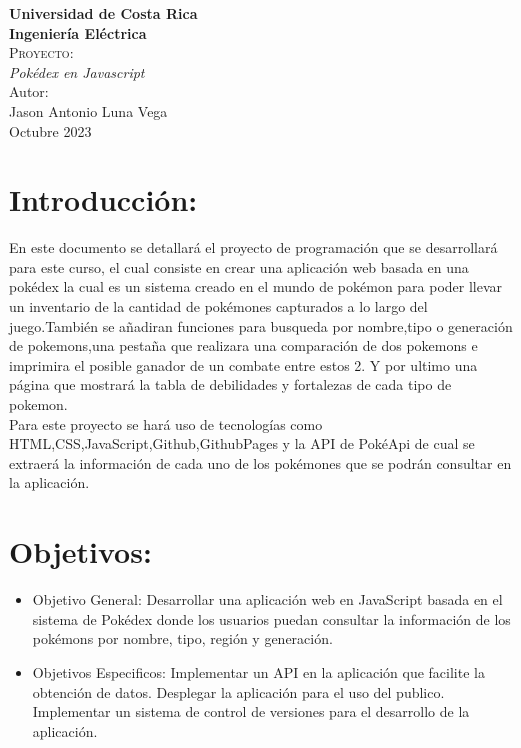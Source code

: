 \documentclass[12pt]{article}
\begin{document}
	\begin{titlepage}
		\centering
		\textbf{\LARGE Universidad de Costa Rica}\\
		\vspace{3cm}
		\textbf{\Large Ingeniería Eléctrica}\\
		\vspace{1.5cm}
		\textsc{ \Huge Proyecto:}\\
		\vspace{3cm}
		\textit{\Large Pokédex en Javascript }\\
		\vfill       
		\Large Autor: \\
		\Large Jason Antonio Luna Vega\\
		\vfill
		\Large Octubre 2023\\
	\end{titlepage}
	
	\tableofcontents\vspace{18cm}

    \section{Introducción: }
    En este documento se detallará el proyecto de programación que se desarrollará para este curso, el cual consiste en crear una aplicación web basada en una pokédex la cual es un sistema creado en el mundo de pokémon para poder llevar un inventario de la cantidad de pokémones capturados a lo largo del juego.También se añadiran funciones para busqueda por nombre,tipo o generación de pokemons,una pestaña que realizara una comparación de dos pokemons e imprimira el posible ganador de un combate entre estos 2. Y por ultimo una página que mostrará la tabla de debilidades y fortalezas de cada tipo de pokemon.\vspace{0.5cm}
    \\
    Para este proyecto se hará uso de tecnologías como HTML,CSS,JavaScript,Github,GithubPages y la API de PokéApi de cual se extraerá la información de cada uno de los pokémones que se podrán consultar en la aplicación.\vspace{0.5cm}
    \\

    \section{Objetivos: }
        \begin{itemize}
            \item Objetivo General: Desarrollar una aplicación web en JavaScript basada en el sistema de Pokédex donde los usuarios puedan consultar la información de los pokémons por nombre, tipo, región y generación.
            \item Objetivos Especificos:
                \subitem Implementar un API en la aplicación que facilite la obtención de datos.
                \subitem Desplegar la aplicación para el uso del publico.
                \subitem Implementar un sistema de control de versiones para el desarrollo de la aplicación.
        \end{itemize}
\end{document}
